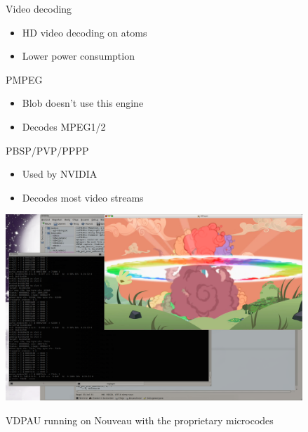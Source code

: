 \documentclass[11pt,english,compress]{beamer}
\begin{document}
		\begin{frame}
			\begin{block}{Video decoding}
				\begin{itemize}
					\item HD video decoding on atoms
					\item Lower power consumption
				\end{itemize}
			\end{block}

			\begin{block}{PMPEG}
				\begin{itemize}
					\item Blob doesn't use this engine
					\item Decodes MPEG1/2
				\end{itemize}
			\end{block}

			\begin{block}{PBSP/PVP/PPPP}
				\begin{itemize}
					\item Used by NVIDIA
					\item Decodes most video streams
				\end{itemize}
			\end{block}
		\end{frame}

		\begin{frame}
			\begin{center}
				\includegraphics[height=7cm]{imgs/h264_vp_decoded2.png}
			\end{center}
			\begin{center}
				VDPAU running on Nouveau with the proprietary microcodes
			\end{center}
		\end{frame}
\end{document}
